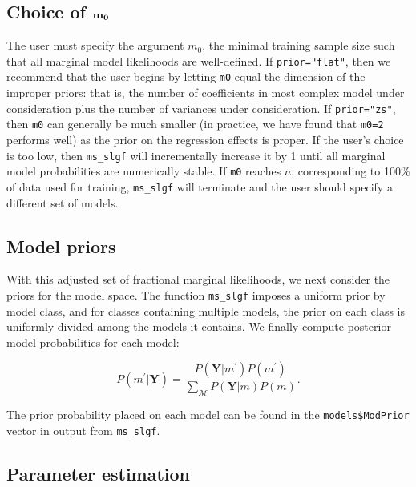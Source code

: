 \subsection{Choice of $\bf{m_0}$}\hypertarget{subsection:m0}{}

The user must specify the argument $m_0$, the minimal training sample size such that all marginal model likelihoods are well-defined. If \texttt{prior="flat"}, then we recommend that the user begins by letting \texttt{m0} equal the dimension of the improper priors: that is, the number of coefficients in most complex model under consideration plus the number of variances under consideration. If \texttt{prior="zs"}, then \texttt{m0} can generally be much smaller (in practice, we have found that \texttt{m0=2} performs well) as the prior on the regression effects is proper. If the user's choice is too low, then \texttt{ms\_slgf} will incrementally increase it by 1 until all marginal model probabilities are numerically stable. If \texttt{m0} reaches $n$, corresponding to 100\% of data used for training, \texttt{ms\_slgf} will terminate and the user should specify a different set of models. 

\subsection{Model priors}\hypertarget{subsection:modelpriors}{}

With this adjusted set of fractional marginal likelihoods, we next consider the priors for the model space. The function \texttt{ms\_slgf} imposes a uniform prior by model class, and for classes containing multiple models, the prior on each class is uniformly divided among the models it contains. We finally compute posterior model probabilities for each model: 

\begin{equation}
P(m^{\prime}|\boldsymbol{Y})=\frac{P(\boldsymbol{Y}|m^{\prime})P(m^{\prime})}{\underset{\mathcal{M}}{\sum}P(\boldsymbol{Y}|m)P(m)}.
\end{equation}

The prior probability placed on each model can be found in the \texttt{models\$ModPrior} vector in output from \texttt{ms\_slgf}. 

\subsection{Parameter estimation}\hypertarget{subsection:estimation}{}

